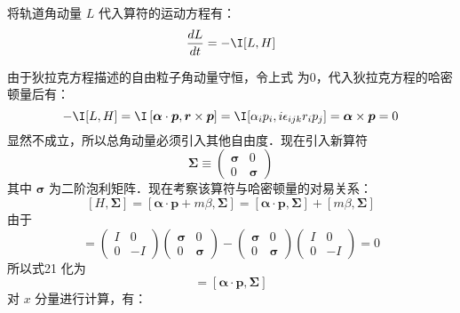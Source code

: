 将轨道角动量 $L$ 代入算符的运动方程有：
\begin{equation}\label{qed4_eq16}
\frac{d {L}}{d t}=- \I[L,H]
\end{equation}

由于狄拉克方程描述的自由粒子角动量守恒，令上式 为0，代入狄拉克方程的哈密顿量后有：
\begin{equation}\label{qed4_eq18}
- \I[L,H]=
 \I\left[\boldsymbol{\alpha} \cdot \boldsymbol{p},\boldsymbol{r} \times \boldsymbol{p}\right]
= \I[\alpha_ip_i,i\epsilon_{ijk}r_ip_j]=\boldsymbol{\alpha} \times \boldsymbol{p}=0
\end{equation}
显然不成立，所以总角动量必须引入其他自由度．现在引入新算符
\begin{equation}
\boldsymbol{\Sigma} \equiv\left(\begin{array}{cc}
\boldsymbol{\sigma} & 0 \\
0 & \boldsymbol{\sigma}
\end{array}\right)
\end{equation}
其中 $\boldsymbol{\sigma}$ 为二阶泡利矩阵．现在考察该算符与哈密顿量的对易关系：
\begin{equation}\label{qed4_eq17}
[H, \mathbf{\Sigma}]=[\boldsymbol{\alpha} \cdot \boldsymbol{p}+m\beta , \boldsymbol{\Sigma}]=[\boldsymbol{\alpha} \cdot \boldsymbol{p}, \boldsymbol{\Sigma}]+[m\beta , \boldsymbol{\Sigma}]
\end{equation}
由于\begin{equation}
[\beta m, \mathbf{\Sigma}]=\left(\begin{array}{cc}
I & 0 \\
0 & -I
\end{array}\right)\left(\begin{array}{cc}
\boldsymbol{\sigma} & 0 \\
0 & \boldsymbol{\sigma}
\end{array}\right)-\left(\begin{array}{cc}
\boldsymbol{\sigma} & 0 \\
0 & \boldsymbol{\sigma}
\end{array}\right)\left(\begin{array}{cc}
I & 0 \\
0 & -I
\end{array}\right)=0
\end{equation}
所以式21 化为
\begin{equation}
[H, \Sigma]=[\boldsymbol{\alpha} \cdot \boldsymbol{p}, \boldsymbol{\Sigma}]
\end{equation}
对 $x$ 分量进行计算，有：
